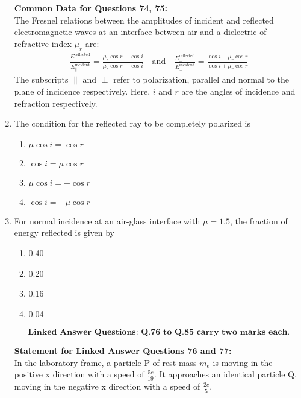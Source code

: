 \documentclass[journal]{IEEEtran}
\begin{document}
\begin{enumerate}[start=69]
\textbf{Common Data for Questions 74, 75:} \\
The Fresnel relations between the amplitudes of incident and reflected electromagnetic waves at an interface between air and a dielectric of refractive index $\mu_r$ are:
\begin{align*}
    \frac{E_\parallel^\text{reflected}}{E_\parallel^\text{incident}} = \frac{\mu_r \cos r - \cos i}{\mu_r \cos r + \cos i} 
    \quad \text{and} \quad
    \frac{E_\perp^\text{reflected}}{E_\perp^\text{incident}} = \frac{\cos i - \mu_r \cos r}{\cos i + \mu_r \cos r}
\end{align*}
The subscripts $\parallel$ and $\perp$ refer to polarization, parallel and normal to the plane of incidence respectively. Here, $i$ and $r$ are the angles of incidence and refraction respectively.

\item The condition for the reflected ray to be completely polarized is
\begin{multicols}{4}
\begin{enumerate}
    \item $\mu \cos i = \cos r$
    \item $\cos i = \mu \cos r$
    \item $\mu \cos i = -\cos r$
    \item $\cos i = -\mu \cos r$
\end{enumerate}
\end{multicols}

\item For normal incidence at an air-glass interface with $\mu = 1.5$, the fraction of energy reflected is given by
\begin{multicols}{4}
\begin{enumerate}
    \item 0.40
    \item 0.20
    \item 0.16
    \item 0.04
\end{enumerate}
\end{multicols}
$$\textbf{Linked Answer Questions: Q.76 to Q.85 carry two marks each.}$$

\textbf{Statement for Linked Answer Questions 76 and 77:}\\
In the laboratory frame, a particle P of rest mass $m_e$ is moving in the positive x direction with a speed of $\frac{5c}{19}$. It approaches an identical particle Q, moving in the negative x direction with a speed of $\frac{2c}{5}$.



\end{enumerate}
\end{document}
